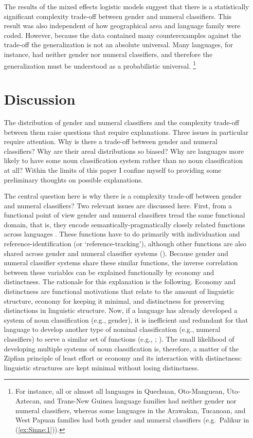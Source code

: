 \documentclass[output=collectionpaper]{langsci/langscibook}
\begin{document}
The results of the mixed effects logistic models suggest that there is a statistically significant complexity trade-off between gender and numeral classifiers. This result was also independent of how geographical area and language family were coded. However, because the data contained many counterexamples against the trade-off the generalization is not an absolute universal. Many languages, for instance, had neither gender nor numeral classifiers, and therefore the generalization must be understood as a probabilistic universal.%
\footnote{For instance, all or almost all languages in Quechuan, Oto-Manguean, Uto-Aztecan, and Trans-New Guinea language families had neither gender nor numeral classifiers, whereas some languages in the Arawakan, Tucanoan, and West Papuan families had both gender and numeral classifiers (e.g.\ Palikur in (\ref{ex:Sinne:1})).}


\section{Discussion}
\label{sec:Sinne:5}

The distribution of gender and numeral classifiers and the complexity trade-off between them raise questions that require explanations. Three issues in particular require attention. Why is there a trade-off between gender and numeral classifiers? Why are their areal distributions so biased? Why are languages more likely to have some noun classification system rather than no noun classification at all? Within the limits of this paper I confine myself to providing some preliminary thoughts on possible explanations.

The central question here is why there is a complexity trade-off between gender and numeral classifiers? Two relevant issues are discussed here. First, from a functional point of view gender and numeral classifiers tread the same functional domain, that is, they encode semantically-pragmatically closely related functions across languages \citep[293]{Miestamo2007}. These functions have to do primarily with individuation and reference-identification (or `reference-tracking'), although other functions are also shared across gender and numeral classifier systems (\citealt[293--294]{Contini-Morava2013}). Because gender and numeral classifier systems share these similar functions, the inverse correlation between these variables can be explained functionally by economy and distinctness. The rationale for this explanation is the following. Economy and distinctness are functional motivations that relate to the amount of linguistic structure, economy for keeping it minimal, and distinctness for preserving distinctions in linguistic structure. Now, if a language has already developed a system of noun classification (e.g., gender), it is inefficient and redundant for that language to develop another type of nominal classification (e.g., numeral classifiers) to serve a similar set of functions (e.g., \citealt{Hawkins2004}; \citealt{Sinnemaeki2014}). The small likelihood of developing multiple systems of noun classification is, therefore, a matter of the Zipfian principle of least effort or economy and its interaction with distinctness: linguistic structures are kept minimal without losing distinctness.
\end{document}
